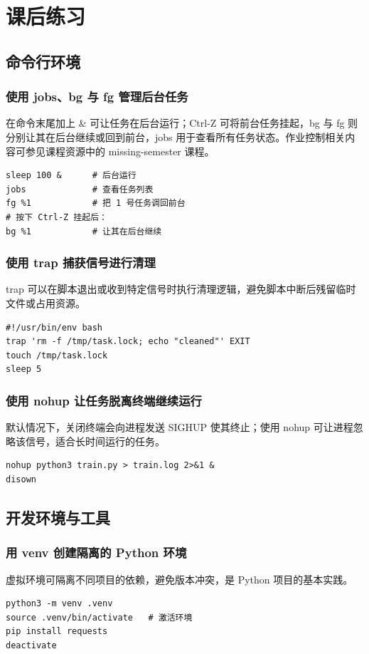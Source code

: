\section{课后练习}

\subsection{命令行环境}

\subsubsection{使用 jobs、bg 与 fg 管理后台任务}
在命令末尾加上 \& 可让任务在后台运行；Ctrl-Z 可将前台任务挂起，bg 与 fg 则分别让其在后台继续或回到前台，jobs 用于查看所有任务状态。作业控制相关内容可参见课程资源中的 missing-semester 课程。
\begin{verbatim}
sleep 100 &      # 后台运行
jobs             # 查看任务列表
fg %1            # 把 1 号任务调回前台
# 按下 Ctrl-Z 挂起后：
bg %1            # 让其在后台继续
\end{verbatim}

\subsubsection{使用 trap 捕获信号进行清理}
trap 可以在脚本退出或收到特定信号时执行清理逻辑，避免脚本中断后残留临时文件或占用资源。
\begin{verbatim}
#!/usr/bin/env bash
trap 'rm -f /tmp/task.lock; echo "cleaned"' EXIT
touch /tmp/task.lock
sleep 5
\end{verbatim}

\subsubsection{使用 nohup 让任务脱离终端继续运行}
默认情况下，关闭终端会向进程发送 SIGHUP 使其终止；使用 nohup 可让进程忽略该信号，适合长时间运行的任务。
\begin{verbatim}
nohup python3 train.py > train.log 2>&1 &
disown
\end{verbatim}

\subsection{开发环境与工具}

\subsubsection{用 venv 创建隔离的 Python 环境}
虚拟环境可隔离不同项目的依赖，避免版本冲突，是 Python 项目的基本实践。
\begin{verbatim}
python3 -m venv .venv
source .venv/bin/activate   # 激活环境
pip install requests
deactivate
\end{verbatim}

